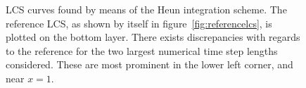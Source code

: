 \begin{figure}[htpb]
    \centering
    
    \caption[LCS curves found by means of the Heun integration scheme]{
        LCS curves found by means of the Heun integration scheme. The
        reference LCS, as shown by itself in figure~\ref{fig:referencelcs},
        is plotted on the bottom layer. There exists discrepancies with
        regards to the reference for the two largest numerical time step
        lengths considered. These are most prominent in the lower left corner,
        and near $x=1$.}
    \label{fig:lcs_rk2}
\end{figure}
